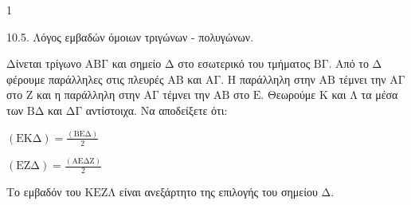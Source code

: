 \begin{ylh}{1}
    \item 10.5. Λόγος εμβαδών όμοιων τριγώνων - πολυγώνων.
\end{ylh}
Δίνεται τρίγωνο $\text{ΑΒΓ}$ και σημείο $\text{Δ}$ στο εσωτερικό του τμήματος $\text{ΒΓ}$. Από το $\text{Δ}$ φέρουμε παράλληλες στις πλευρές $\text{ΑΒ}$ και $\text{ΑΓ}$. Η παράλληλη στην $\text{ΑΒ}$ τέμνει την $\text{ΑΓ}$ στο $\text{Ζ}$ και η παράλληλη στην $\text{ΑΓ}$ τέμνει την $\text{ΑΒ}$ στο $\text{Ε}$. Θεωρούμε $\text{Κ}$ και $\text{Λ}$ τα μέσα των $\text{ΒΔ}$ και $\text{ΔΓ}$ αντίστοιχα. Να αποδείξετε ότι:
\begin{alist}
\item $(\text{ΕΚΔ}) = \frac{(\text{ΒΕΔ})}{2}$ 
\item $(\text{ΕΖΔ}) = \frac{(\text{ΑΕΔΖ})}{2}$ 
\item Το εμβαδόν του $\text{ΚΕΖΛ}$ είναι ανεξάρτητο της επιλογής του σημείου $\text{Δ}$. 
\end{alist}